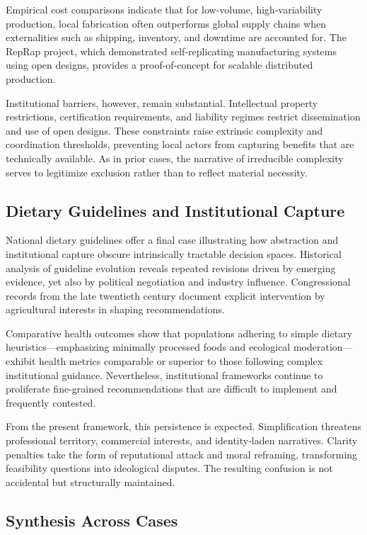 \documentclass[11pt]{article}
\begin{document}
Empirical cost comparisons indicate that for low-volume, high-variability production, local fabrication often outperforms global supply chains when externalities such as shipping, inventory, and downtime are accounted for. The RepRap project, which demonstrated self-replicating manufacturing systems using open designs, provides a proof-of-concept for scalable distributed production.

Institutional barriers, however, remain substantial. Intellectual property restrictions, certification requirements, and liability regimes restrict dissemination and use of open designs. These constraints raise extrinsic complexity and coordination thresholds, preventing local actors from capturing benefits that are technically available. As in prior cases, the narrative of irreducible complexity serves to legitimize exclusion rather than to reflect material necessity.

\subsection{Dietary Guidelines and Institutional Capture}

National dietary guidelines offer a final case illustrating how abstraction and institutional capture obscure intrinsically tractable decision spaces. Historical analysis of guideline evolution reveals repeated revisions driven by emerging evidence, yet also by political negotiation and industry influence. Congressional records from the late twentieth century document explicit intervention by agricultural interests in shaping recommendations.

Comparative health outcomes show that populations adhering to simple dietary heuristics—emphasizing minimally processed foods and ecological moderation—exhibit health metrics comparable or superior to those following complex institutional guidance. Nevertheless, institutional frameworks continue to proliferate fine-grained recommendations that are difficult to implement and frequently contested.

From the present framework, this persistence is expected. Simplification threatens professional territory, commercial interests, and identity-laden narratives. Clarity penalties take the form of reputational attack and moral reframing, transforming feasibility questions into ideological disputes. The resulting confusion is not accidental but structurally maintained.

\subsection{Synthesis Across Cases}
\end{document}
